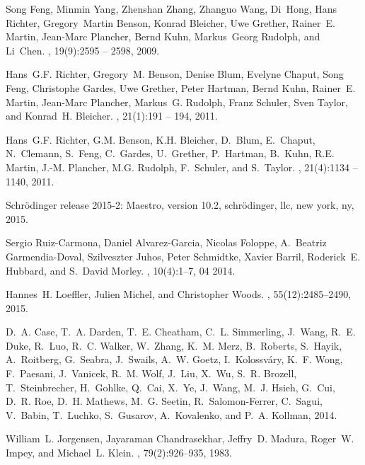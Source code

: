 \documentclass{svjour3}                     %
\begin{document}
\begin{thebibliography}{10}
Song Feng, Minmin Yang, Zhenshan Zhang, Zhanguo Wang, Di~Hong, Hans Richter,
  Gregory~Martin Benson, Konrad Bleicher, Uwe Grether, Rainer~E. Martin,
  Jean-Marc Plancher, Bernd Kuhn, Markus~Georg Rudolph, and Li~Chen.
, 19(9):2595 -- 2598, 2009.

Hans~G.F. Richter, Gregory~M. Benson, Denise Blum, Evelyne Chaput, Song Feng,
  Christophe Gardes, Uwe Grether, Peter Hartman, Bernd Kuhn, Rainer~E. Martin,
  Jean-Marc Plancher, Markus~G. Rudolph, Franz Schuler, Sven Taylor, and
  Konrad~H. Bleicher.
, 21(1):191 -- 194, 2011.

Hans~G.F. Richter, G.M. Benson, K.H. Bleicher, D.~Blum, E.~Chaput, N.~Clemann,
  S.~Feng, C.~Gardes, U.~Grether, P.~Hartman, B.~Kuhn, R.E. Martin, J.-M.
  Plancher, M.G. Rudolph, F.~Schuler, and S.~Taylor.
, 21(4):1134 -- 1140, 2011.

Schr\"odinger release 2015-2: Maestro, version 10.2, schrödinger, llc, new
  york, ny, 2015.

Sergio Ruiz-Carmona, Daniel Alvarez-Garcia, Nicolas Foloppe, A.~Beatriz
  Garmendia-Doval, Szilveszter Juhos, Peter Schmidtke, Xavier Barril,
  Roderick~E. Hubbard, and S.~David Morley.
, 10(4):1--7, 04 2014.

Hannes~H. Loeffler, Julien Michel, and Christopher Woods.
, 55(12):2485--2490, 2015.

D.~A. Case, T.~A. Darden, T.~E. Cheatham, C.~L. Simmerling, J.~Wang, R.~E.
  Duke, R.~Luo, R.~C. Walker, W.~Zhang, K.~M. Merz, B.~Roberts, S.~Hayik,
  A.~Roitberg, G.~Seabra, J.~Swails, A.~W. Goetz, I.~Kolossv\'{a}ry, K.~F.
  Wong, F.~Paesani, J.~Vanicek, R.~M. Wolf, J.~Liu, X.~Wu, S.~R. Brozell,
  T.~Steinbrecher, H.~Gohlke, Q.~Cai, X.~Ye, J.~Wang, M.~J. Hsieh, G.~Cui,
  D.~R. Roe, D.~H. Mathews, M.~G. Seetin, R.~Salomon-Ferrer, C.~Sagui,
  V.~Babin, T.~Luchko, S.~Gusarov, A.~Kovalenko, and P.~A. Kollman, 2014.

William~L. Jorgensen, Jayaraman Chandrasekhar, Jeffry~D. Madura, Roger~W.
  Impey, and Michael~L. Klein.
, 79(2):926--935, 1983.


\end{thebibliography}
\end{document}
